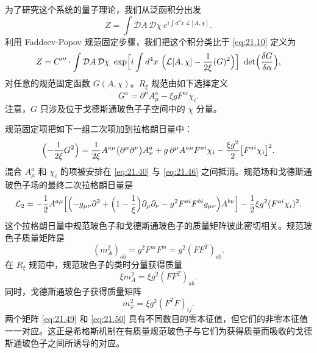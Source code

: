 为了研究这个系统的量子理论，我们从泛函积分出发
\begin{equation}
  Z = \int \mathcal{D}A\,\mathcal{D}\chi\ e^{i\int d^4x\ \mathcal{L}[A,\chi]} .
  \label{eq:21.43}
\end{equation}
利用 Faddeev-Popov 规范固定步骤，我们把这个积分类比于 \eqref{eq:21.10} 定义为
\begin{equation}
  Z = C'''\cdot \int \mathcal{D}A\,\mathcal{D}\chi\ \exp\Bigl[ i\int d^4x\
    \Bigl( \mathcal{L}[A,\chi] - \frac{1}{2\xi}(G)^2 \Bigr) \Bigr]\
    \det\Bigl( \frac{\delta G}{\delta\alpha} \Bigr) ,
  \label{eq:21.44}
\end{equation}
对任意的规范固定函数 $G(A,\chi)$。$R_\xi$ 规范由如下选择定义
\begin{equation}
  G^a = \partial^\mu A^a_\mu - \xi g F^{ai}\chi_i .
  \label{eq:21.45}
\end{equation}
注意，$G$ 只涉及位于戈德斯通玻色子子空间中的 $\chi$ 分量。

规范固定项把如下一组二次项加到拉格朗日量中：
\begin{equation}
  \Bigl( -\frac{1}{2\xi}G^2 \Bigr) = \frac{1}{2\xi}A^{a\mu}\bigl(
    \partial^\mu\partial^\nu \bigr)A^a_\nu + g\,\partial^\mu A^{a\mu}F^{ai}\chi_i
    - \frac{\xi g^2}{2}\bigl[ F^{ai}\chi_i \bigr]^2 .
  \label{eq:21.46}
\end{equation}
混合 $A^a_\mu$ 和 $\chi_i$ 的项被安排在 \eqref{eq:21.40} 与 \eqref{eq:21.46} 之间抵消。规范场和戈德斯通玻色子场的最终二次拉格朗日量是
\begin{equation}
  \mathcal{L}_2 = -\frac{1}{2}A^{a\mu}\Bigl[ \Bigl( -g_{\mu\nu}\partial^2
    + \Bigl( 1 - \frac{1}{\xi} \Bigr)\partial_\mu\partial_\nu
    - g^2F^{ai}F^{bi}g_{\mu\nu} \Bigr)A^{b\nu} \Bigr]
    - \frac{1}{2}\xi g^2(F^{ai}\chi_i)^2 .
  \label{eq:21.47}
\end{equation}
这个拉格朗日量中规范玻色子和戈德斯通玻色子的质量矩阵彼此密切相关。规范玻色子质量矩阵是
\begin{equation}
  (m^2_A)_{ab} = g^2F^{ai}F^{bi} = g^2(FF^T)_{ab} .
  \label{eq:21.48}
\end{equation}
在 $R_\xi$ 规范中，规范玻色子的类时分量获得质量
\begin{equation}
  \xi m^2_A = \xi g^2(FF^T)_{ab} .
  \label{eq:21.49}
\end{equation}
同时，戈德斯通玻色子获得质量矩阵
\begin{equation}
  m^2_\varphi = \xi g^2(F^TF)_{ij} .
  \label{eq:21.50}
\end{equation}
两个矩阵 \eqref{eq:21.49} 和 \eqref{eq:21.50} 具有不同数目的零本征值，但它们的非零本征值一一对应。这正是希格斯机制在有质量规范玻色子与它们为获得质量而吸收的戈德斯通玻色子之间所诱导的对应。

